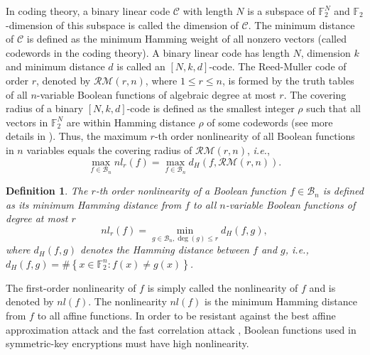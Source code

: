 \documentclass{article}
\newcommand{\F}{\mathbb{F}}
\newcommand{\0}{\textbf{0}}
\newcommand{\1}{\textbf{1}}
\theoremstyle{plain}
\newtheorem{definition}{Definition}
\begin{document}
    In coding theory, a binary linear code $\mathcal{C}$ with length $N$ is a subspace of $\F_2^N$ and $\F_2$-dimension of this subspace is called the dimension of $\mathcal{C}$.
    The minimum distance of $\mathcal{C}$ is defined as the minimum Hamming weight of all nonzero vectors (called codewords in the coding theory).
    A binary linear code has length $N$, dimension $k$ and minimum distance $d$ is called an $\left[ N,k,d \right]$-code.
    The Reed-Muller code of order $r$, denoted by $\mathcal{RM}(r,n)$, where $1\le r\le n$, is formed by the truth tables of all $n$-variable Boolean functions of algebraic degree at most $r$. The covering radius of a binary $\left[ N,k,d \right]$-code is defined as the smallest integer $\rho$ such that all
    vectors in $\F_2^N$ are within Hamming distance $\rho$ of some codewords (see more details in \cite{MS1977}).
    Thus, the maximum $r$-th order nonlinearity of all Boolean functions in $n$ variables equals the covering radius of $\mathcal{RM}(r,n)$, \emph{i.e.},
    \[\max_{f\in \mathcal{B}_n}nl_r(f)=\max_{f\in\mathcal{B}_n}d_H(f,\mathcal{RM}(r,n)).\]
    \begin{definition}
        The $r$-th order nonlinearity of a Boolean function $f\in\mathcal{B}_n$ is defined as its minimum Hamming distance from $f$ to all $n$-variable Boolean functions of degree at most $r$
        \[nl_r(f)=\min_{g\in\mathcal{B}_n,\deg(g)\le r} d_H(f,g),\]
        where $d_H(f,g)$ denotes the Hamming distance between $f$ and $g$, i.e., $d_H(f,g)=\#\left\{ x\in\F_2^n : f(x)\ne g(x) \right\}$.
    \end{definition}
    The first-order nonlinearity of $f$ is simply called the nonlinearity of $f$ and is denoted by $nl(f)$.
    The nonlinearity $nl(f)$ is the minimum Hamming distance from $f$ to all affine functions.
    In order to be resistant against the best affine approximation attack \cite{DingXS1991book} and the fast correlation attack \cite{MS1988fast_correlation_attack}, Boolean functions used in symmetric-key encryptions must have high nonlinearity.
\end{document}
